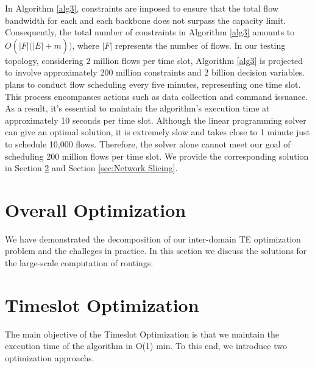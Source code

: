 In Algorithm \ref{alg3}, constraints are imposed to ensure that the total flow bandwidth for each {\egress} and each backbone does not surpass the capacity limit. Consequently, the total number of constraints in Algorithm \ref{alg3} amounts to $O(|F|\dot (|E|+m))$, where $|F|$ represents the number of flows. In our testing topology, considering 2 million flows per time slot, Algorithm \ref{alg3} is projected to involve approximately 200 million constraints and 2 billion decision variables. {\sys} plans to conduct flow scheduling every five minutes, representing one time slot. This process encompasses actions such as data collection and command issuance. As a result, it's essential to maintain the algorithm's execution time at approximately 10 seconds per time slot. Although the linear programming solver can give an optimal solution, it is extremely slow and takes close to 1 minute just to schedule 10,000 flows. Therefore, the solver alone cannot meet our goal of scheduling 200 million flows per time slot. We provide the corresponding solution in Section \ref{sec:timeslot-slu} and Section \ref{sec:Network Slicing}.




\section{Overall Optimization}\label{sec:overall-slu}
We have demonstrated the decomposition of our inter-domain TE optimization problem and the challeges in practice. In this section we discuss the solutions for the large-scale computation of routings.


\section{Timeslot Optimization}\label{sec:timeslot-slu}
The main objective of the Timeslot Optimization is that we maintain the execution time of the algorithm in O(1) min. To this end, we introduce two optimization approachs. 

